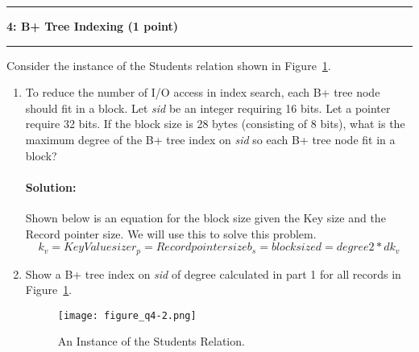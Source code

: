 \documentclass[11pt]{article}
\newcommand\question[2]{\vspace{.25in}\hrule\textbf{#1: #2}\vspace{.5em}\hrule\vspace{.10in}}
\begin{document}
\question{4}{B+ Tree Indexing (1 point)}
Consider the instance of the Students relation shown in Figure~\ref{figure:q4}. 
\begin{enumerate}
	
	\item To reduce the number of I/O access in index search, each B+ tree node should fit in a block. Let {\it sid} be an integer requiring 16 bits. Let a pointer require 32 bits.
	If the block size is 28 bytes (consisting of 8 bits), what is the maximum degree of the B+ tree index on {\it sid} so each B+ tree node fit in a block?
	
	\paragraph{Solution:} \hfill \break
	Shown below is an equation for the block size given the Key size and the Record pointer size. We will use this to solve this problem.\\
	
\begin{equation}
	k_v = Key Value size
	r_p = Record pointer size
	b_s = block size
	d = degree
	2*d k_v 
\end{equation} 
	
	

	\item Show a B+ tree index on {\it sid} of degree calculated in part 1 for all records in Figure~\ref{figure:q4}.
	
	\begin{figure}[h]
		\centering
		\texttt{[image: figure\_q4-2.png]}
		\caption{An Instance of the Students Relation.}
		\label{figure:q4}
	\end{figure}
	

	
	
	

\end{enumerate}
\end{document}
